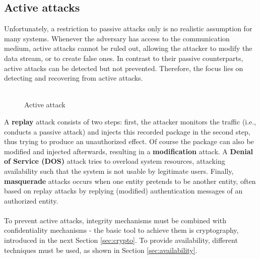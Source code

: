 \subsection{Active attacks}
Unfortunately, a restriction to passive attacks only is no realistic assumption for many systems. Whenever the adversary has access to the communication medium, active attacks
cannot be ruled out, allowing the attacker to modify the data stream, or to create false ones. In contrast to their passive counterparts, active attacks can be detected but
not prevented. Therefore, the focus lies on detecting and recovering from active attacks.
\\
\\
\begin{figure}[hf]
\centering
{}
\label{fig:actAttack}
\caption{Active attack}
\end{figure}
A \textbf{replay} attack consists of two steps: first, the attacker monitors the traffic (i.e., conducts a passive attack) and injects this recorded package in the second step,
thus trying to produce an unauthorized effect.
Of course the package can also be modified and injected afterwards, resulting in a \textbf{modification} attack.
A \textbf{Denial of Service (DOS)} attack tries to overload system resources, attacking availability such that the system is not
usable by legitimate users. Finally, \textbf{masquerade} attacks occurs when one entity pretends to be another entity, often based on replay attacks by replying (modified)
authentication messages of an authorized entity.
\\
\\
To prevent active attacks, integrity mechanisms must be combined with confidentiality mechanisms - 
the basic tool to achieve them is cryptography, introduced in the next Section \ref{sec:crypto}. To provide availability, different techniques must be used,
as shown in Section \ref{sec:availability}.

